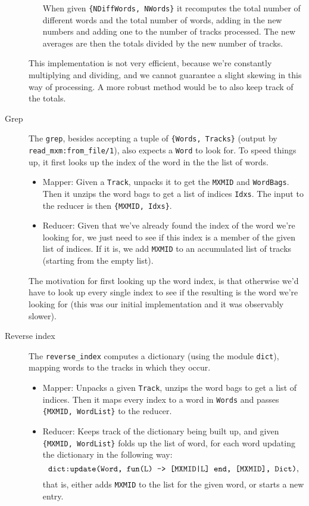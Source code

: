 \documentclass[a4paper]{article}
\begin{document}
\begin{description}
\begin{itemize}
    When given \texttt{\{NDiffWords, NWords\}} it recomputes the total number of different words and the total number of words, adding in the new numbers and adding one to the number of tracks processed. The new averages are then the totals divided by the new number of tracks.
  \end{itemize}
  This implementation is not very efficient, because we're constantly multiplying and dividing, and we cannot guarantee a slight skewing in this way of processing. A more robust method would be to also keep track of the totals.
\item[Grep]
  The \texttt{grep}, besides accepting a tuple of \texttt{\{Words, Tracks\}} (output by \texttt{read\_mxm:from\_file/1}), also expects a \texttt{Word} to look for. To speed things up, it first looks up the index of the word in the the list of words.
  \begin{itemize}
    \item Mapper: Given a \texttt{Track}, unpacks it to get the \texttt{MXMID} and \texttt{WordBags}. Then it unzips the word bags to get a list of indices \texttt{Idxs}. The input to the reducer is then \texttt{\{MXMID, Idxs\}}.
    \item Reducer: Given that we've already found the index of the word we're looking for, we just need to see if this index is a member of the given list of indices. If it is, we add \texttt{MXMID} to an accumulated list of tracks (starting from the empty list).
  \end{itemize}
  The motivation for first looking up the word index, is that otherwise we'd have to look up every single index to see if the resulting is the word we're looking for (this was our initial implementation and it was observably slower).
\item[Reverse index]
  The \texttt{reverse\_index} computes a dictionary (using the module \texttt{dict}), mapping words to the tracks in which they occur.
  \begin{itemize}
    \item Mapper: Unpacks a given \texttt{Track}, unzips the word bags to get a list of indices. Then it maps every index to a word in \texttt{Words} and passes \texttt{\{MXMID, WordList\}} to the reducer.
    \item Reducer: Keeps track of the dictionary being built up, and given \texttt{\{MXMID, WordList\}} folds up the list of word, for each word updating the dictionary in the following way:
      \[
      \text{\texttt{dict:update(Word, fun(L) -> [MXMID|L] end, [MXMID], Dict)}},
      \]
      that is, either adds \texttt{MXMID} to the list for the given word, or starts a new entry.
  \end{itemize}
\end{description}
\end{document}
